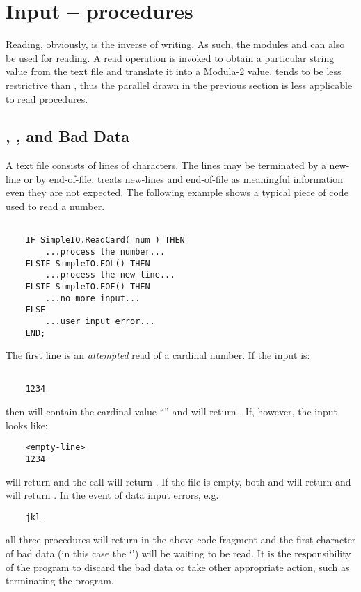 \section{Input --  procedures}

Reading, obviously, is the inverse of writing.  As such, the modules
 and  can also be used for 
reading.    
A read operation is invoked to obtain
a particular string value from the text file and translate it
into a Modula-2 value.   tends to be less
restrictive than , thus the parallel drawn
in the previous section is less applicable to read procedures. 


\subsection{, , and Bad Data}

A text file consists of lines of characters.  The lines
may be terminated by a new-line or by end-of-file.  
treats new-lines and end-of-file as meaningful information even
they are not expected.  The following example shows a typical
piece of code used to read a number.
\begin{verbatim}

    IF SimpleIO.ReadCard( num ) THEN
        ...process the number...
    ELSIF SimpleIO.EOL() THEN
        ...process the new-line...
    ELSIF SimpleIO.EOF() THEN
        ...no more input...
    ELSE
        ...user input error...
    END;
\end{verbatim}
The first line is an {\em attempted} read of a cardinal number.  If
the input is:
\begin{verbatim}

    1234

\end{verbatim}
then  will contain the cardinal value ``'' and 
 will return .  If, however, the
input looks like:
\begin{verbatim}
    <empty-line>
    1234
\end{verbatim}
 will return  and 
the  call will return .  If
the file is empty, both  and  will
return  and  will return .
In the event of data input errors, e.g.
\begin{verbatim}
    jkl
\end{verbatim}
all three procedures will return  in the above code
fragment and the first character of bad data (in this case the `')
will be waiting to be read.  It is the responsibility of the program
to discard the bad data or take other appropriate action, such as terminating
the program.


